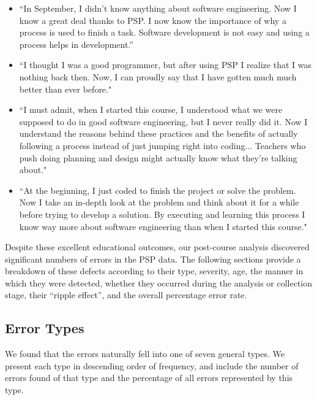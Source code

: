 \begin{itemize}

\item ``In September, I didn't know anything about software
engineering.  Now I know a great deal thanks to PSP.  I now
know the importance of why a process is used to finish a
task.  Software development is not easy and using a process
helps in development.'' 

\item ``I thought I was a good programmer, but after using
PSP I realize that I was nothing back then.  Now, I can
proudly say that I have gotten much much better than ever
before."

\item ``I must admit, when I started this course, I understood what we were
  supposed to do in good software engineering, but I never really did it.
  Now I understand the reasons behind these practices and the benefits of
  actually following a process instead of just jumping right into coding...
  Teachers who push doing planning and design might actually know what
  they're talking about."

\item ``At the beginning, I just coded to finish the project
or solve the problem. Now I take an in-depth look at the
problem and think about it for a while before trying to
develop a solution.  By executing and learning this process
I know way more about software engineering than when I
started this course."

\end{itemize}



Despite these excellent educational outcomes, our post-course analysis
discovered significant numbers of errors in the PSP data.  The following
sections provide a breakdown of these defects according to their type,
severity, age, the manner in which they were detected, whether they
occurred during the analysis or collection stage, their ``ripple
effect'', and the overall percentage error rate.


\subsection{Error Types}

We found that the errors naturally fell into one of seven general types.
We present each type in descending order of frequency, and include the
number of errors found of that type and the percentage of all errors
represented by this type.

